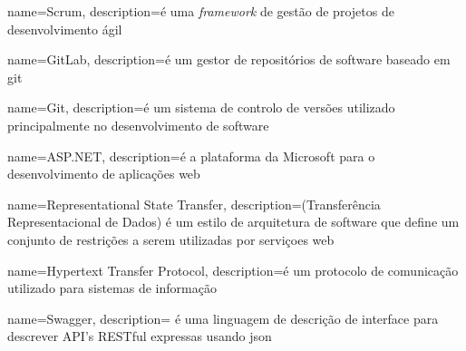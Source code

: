 {
	name=Scrum,
	description={é uma \textit{framework} de gestão de projetos de desenvolvimento ágil}
}

{
	name=GitLab,
	description={é um gestor de repositórios de software baseado em \gls{git}}
}

{
	name=Git,
	description={é um sistema de controlo de versões utilizado principalmente no
	desenvolvimento de software}
}

{
	name=ASP.NET,
	description={é a plataforma da Microsoft para o desenvolvimento de aplicações web}
}

{
	name={Representational State Transfer},
	description={(Transferência Representacional de Dados) é um estilo de arquitetura de
	software que define um conjunto de restrições a serem utilizadas por serviçoes web}
}

{
	name={Hypertext Transfer Protocol},
	description={é um protocolo de comunicação utilizado para sistemas de informação}
}

{
	name={Swagger},
	description={ é uma linguagem de descrição de interface para descrever API's RESTful
	expressas usando \acrshort{json}}
}








